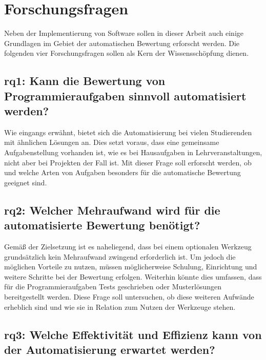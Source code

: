 \section{Forschungsfragen}\label{sec:research-questions}

Neben der Implementierung von Software sollen in dieser Arbeit auch einige Grundlagen im Gebiet der automatischen Bewertung erforscht werden.
Die folgenden vier Forschungsfragen sollen als Kern der Wissensschöpfung dienen.

\subsection[\acs{rq}1]{\ac{rq}1: Kann die Bewertung von Programmieraufgaben sinnvoll automatisiert werden?}\label{subsec:rq1-useful-automation}

Wie eingangs erwähnt, bietet sich die Automatisierung bei vielen Studierenden mit ähnlichen Lösungen an.
Dies setzt voraus, dass eine gemeinsame Aufgabenstellung vorhanden ist, wie es bei Hausaufgaben in Lehrveranstaltungen, nicht aber bei Projekten der Fall ist.
Mit dieser Frage soll erforscht werden, ob und welche Arten von Aufgaben besonders für die automatische Bewertung geeignet sind.

\subsection[\acs{rq}2]{\ac{rq}2: Welcher Mehraufwand wird für die automatisierte Bewertung benötigt?}\label{subsec:rq2-additional-effort}

Gemäß der Zielsetzung ist es naheliegend, dass bei einem optionalen Werkzeug grundsätzlich kein Mehraufwand zwingend erforderlich ist.
Um jedoch die möglichen Vorteile zu nutzen, müssen möglicherweise Schulung, Einrichtung und weitere Schritte bei der Bewertung erfolgen.
Weiterhin könnte dies umfassen, dass für die Programmieraufgaben Tests geschrieben oder Musterlösungen bereitgestellt werden.
Diese Frage soll untersuchen, ob diese weiteren Aufwände erheblich sind und wie sie in Relation zum Nutzen der Werkzeuge stehen.

\subsection[\acs{rq}3]{\ac{rq}3: Welche Effektivität und Effizienz kann von der Automatisierung erwartet werden?}\label{subsec:rq3-effectivity-efficiency}

